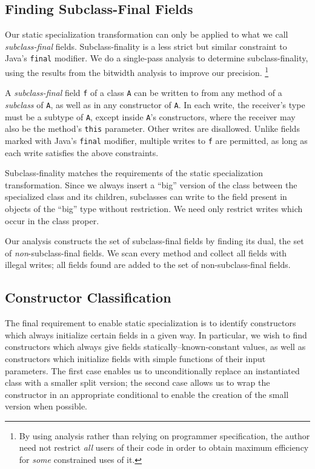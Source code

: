 \documentclass{sig-alt-full}
\begin{document}
\subsection{Finding Subclass-Final Fields}
\label{sec:subclass-final}
Our static specialization transformation can only be applied to what
we call {\it subclass-final} fields.  Subclass-finality is a less strict
but similar constraint to Java's {\tt final} modifier.  We do a
single-pass analysis to determine subclass-finality, using the results
from the bitwidth analysis to improve our precision.%
\footnote{By using analysis rather than relying on programmer
  specification, the author need not restrict \emph{all} users of
  their code in order to obtain maximum efficiency for \emph{some}
  constrained uses of it.}

A \emph{subclass-final} field {\tt f} of a class {\tt A} can be
written to from any method of a \emph{subclass} of {\tt A}, as well as
in any constructor of {\tt A}.  In each write, the receiver's type
must be a subtype of {\tt A}, except inside {\tt A}'s constructors,
where the receiver may also be the method's {\tt this} parameter.
Other writes are disallowed.  Unlike fields marked with Java's
{\tt final} modifier,
multiple writes to {\tt f} are permitted, as long as each write
satisfies the above constraints.

Subclass-finality matches the requirements of the static
specialization transformation.  Since we always insert a ``big''
version of the class between the specialized class and its children,
subclasses can write to the field present in objects of the ``big'' type
without restriction.
We need only restrict writes which occur in the class proper.

Our analysis constructs the set of subclass-final fields by finding
its dual, the set of {\it non}-subclass-final fields.  We scan every
method and collect all fields with illegal writes; all
fields found are added to the set of non-subclass-final fields.

\subsection{Constructor Classification}
The final requirement to enable static specialization is to identify
constructors which always initialize certain fields in a given way.
In particular, we wish to find constructors which always give fields
statically--known-constant values, as well as constructors which
initialize fields with simple functions of their input parameters.
The first case enables us to unconditionally replace an instantiated
class with a smaller split version; the second case allows us to wrap
the constructor in an appropriate conditional to enable the creation
of the small version when possible.
\end{document}
